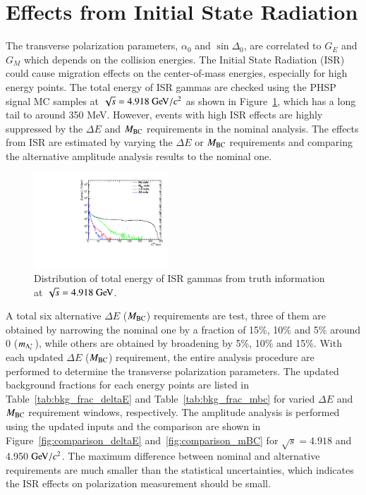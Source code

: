 \clearpage
\section{Effects from Initial State Radiation}
\label{app:isr}
The transverse polarization parameters, $\alpha_0$ and $\sin\Delta_0$, are correlated to $G_E$ and $G_M$ which depends on the collision energies. The Initial State Radiation (ISR) could cause migration effects on the center-of-mass energies, especially for high energy points. The total energy of ISR gammas are checked using the PHSP signal MC samples at $\sqrt{s} = 4.918\gev/c^2$ as shown in Figure~\ref{fig:isr_energy}, which has a long tail to around 350 MeV. However, events with high ISR effects are highly suppressed by the $\Delta E$ and $M_{\rm{BC}}$ requirements in the nominal analysis. The effects from ISR are estimated by varying the $\Delta E$ or $M_{\rm{BC}}$ requirements and comparing the alternative amplitude analysis results to the nominal one.

\begin{figure}[H]\centering
    \includegraphics[width=0.45\textwidth]{figure/isr_effects/output_4914_phsp_ISR_gamma_E.pdf}
    \caption{Distribution of total energy of ISR gammas from truth information at $\sqrt{s} = 4.918\gev$.}
\label{fig:isr_energy}
\end{figure}

A total six alternative $\Delta E$ ($M_{\rm{BC}}$) requirements are test, three of them are obtained by narrowing the nominal one by a fraction of 15\%, 10\% and 5\% around 0 ($m_{\Lambda_{c}^{+}}$), while others are obtained by broadening by 5\%, 10\% and 15\%. With each updated $\Delta E$ ($M_{\rm{BC}}$) requirement, the entire analysis procedure are performed to determine the transverse polarization parameters. The updated background fractions for each energy points are listed in Table~\ref{tab:bkg_frac_deltaE} and Table~\ref{tab:bkg_frac_mbc} for varied $\Delta E$ and $M_{\rm{BC}}$ requirement windows, respectively. The amplitude analysis is performed using the updated inputs and the comparison are shown in Figure~\ref{fig:comparison_deltaE} and~\ref{fig:comparison_mBC} for $\sqrt{s} = 4.918$ and 4.950$\gev/c^2$. The maximum difference between nominal and alternative requirements are much smaller than the statistical uncertainties, which indicates the ISR effects on polarization measurement should be small.  


